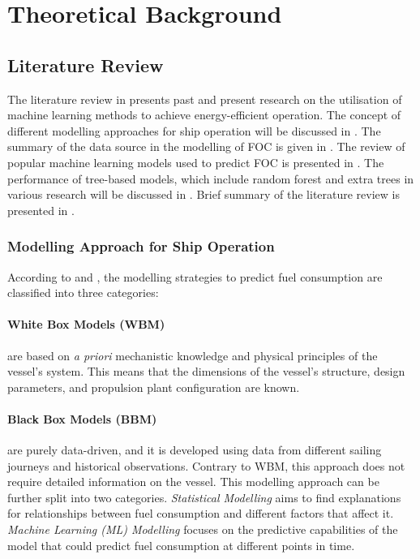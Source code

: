\chapter{Theoretical Background}\label{chp:theory}

\section{Literature Review}\label{sec:litreview}


The literature review in  presents past and present research on the utilisation of machine learning methods to achieve energy-efficient operation. The concept of different modelling approaches for ship operation will be discussed in . The summary of the data source in the modelling of FOC is given in . The review of popular machine learning models used to predict FOC is presented in . The performance of tree-based models, which include random forest and extra trees in various research will be discussed in . Brief summary of the literature review is presented in .\\

\subsection{Modelling Approach for Ship Operation}\label{sec:modelling_type}

According to  and , the modelling strategies to predict fuel consumption are classified into three categories:\\

\subsubsection*{\textbf{White Box Models (WBM)}} are based on \emph{a priori} mechanistic knowledge and physical principles of the vessel's system. This means that the dimensions of the vessel's structure, design parameters, and propulsion plant configuration are known.\\

\subsubsection*{\textbf{Black Box Models (BBM)}} are purely data-driven, and it is developed using data from different sailing journeys and historical observations. Contrary to WBM, this approach does not require detailed information on the vessel. This modelling approach can be further split into two categories. \emph{Statistical Modelling} aims to find explanations for relationships between fuel consumption and different factors that affect it. \emph{Machine Learning (ML) Modelling} focuses on the predictive capabilities of the model that could predict fuel consumption at different points in time.\\

